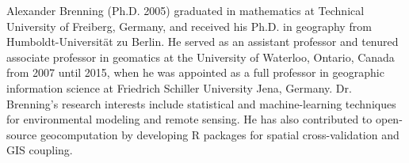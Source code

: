 \documentclass[final]{IEEEtran}
\begin{document}
\begin{IEEEbiography}
	{Alexander Brenning}
	(Ph.D. 2005) graduated in mathematics at Technical University of Freiberg, Germany, and received his Ph.D. in geography from Humboldt-Universität zu Berlin.
	He served as an assistant professor and tenured associate professor in geomatics at the University of Waterloo, Ontario, Canada from 2007 until 2015, when he was appointed as a full professor in geographic information science at Friedrich Schiller University Jena, Germany.
	Dr. Brenning's research interests include statistical and machine-learning techniques for environmental modeling and remote sensing.
	He has also contributed to open-source geocomputation by developing R packages for spatial cross-validation and GIS coupling.
\end{IEEEbiography}
\end{document}
